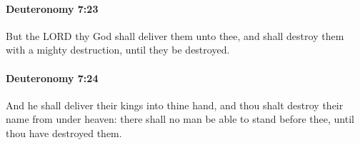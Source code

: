 		\paragraph{Deuteronomy 7:23} %
			\label{DEUTERONOMY-7-23}

			But the LORD thy God shall deliver them unto thee, and shall destroy them with a mighty destruction, until they be destroyed.


		\paragraph{Deuteronomy 7:24} %
			\label{DEUTERONOMY-7-24}

			And he shall deliver their kings into thine hand, and thou shalt destroy their name from under heaven: there shall no man be able to stand before thee, until thou have destroyed them.


